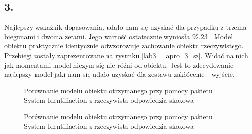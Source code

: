 \subsection{3. }
Najlepszy wskaźnik dopasowania, udało nam się uzyskać dla przypadku z trzema biegunami i dwoma zerami. Jego wartość ostatecznie wyniosła $\num{92,23}$ \text{\%}. Model obiektu praktycznie identycznie odwzorowuje zachowanie obiektu rzeczywistego. Przebiegi zostały zaprezentowane na rysunku \ref{lab3__apro_3_sz}. Widać na nich jak momentami model niczym się nie różni od obiektu. Jest to zdecydowanie najlepszy model jaki nam się udało uzyskać dla zestawu zakłócenie - wyjście. 

\begin{figure}[t]
    \centering
    \caption{Porównanie modelu obiektu otrzymanego przy pomocy pakietu System Identifiaction
z rzeczywista odpowiedzia skokowa}
    \label{lab3_apro_1_sz}
\end{figure}

\begin{figure}[b]
    \centering
    \caption{Porównanie modelu obiektu otrzymanego przy pomocy pakietu System Identifiaction
z rzeczywista odpowiedzia skokowa}
    \label{lab3__apro_2_sz}
\end{figure}

